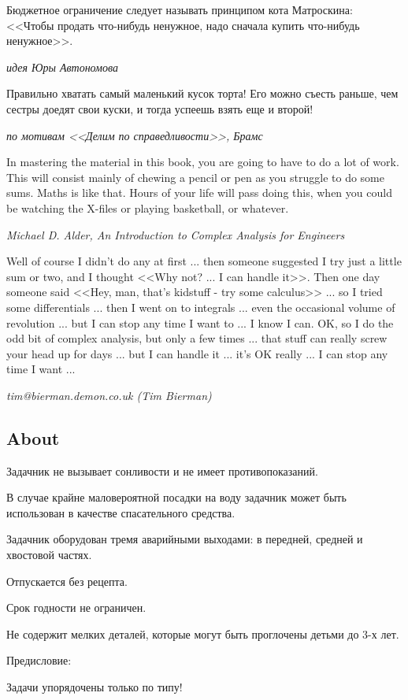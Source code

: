 Бюджетное ограничение следует называть принципом кота Матроскина: <<Чтобы продать что-нибудь ненужное, надо сначала купить что-нибудь ненужное>>.\par
{\it идея Юры Автономова}\par

Правильно хватать самый маленький кусок торта! Его можно съесть раньше, чем сестры доедят свои куски, и тогда успеешь взять еще и второй!\par
{\it по мотивам <<Делим по справедливости>>, Брамс}\par



In mastering the material in this book, you are going to have to do a lot of work. This will consist mainly of chewing a pencil or pen as you struggle to do some sums. Maths is like that. Hours of your life will pass doing this, when you could be watching the X-files or playing basketball, or whatever.\par
{\it Michael D. Alder, An Introduction to  Complex Analysis for Engineers}\par


Well of course I didn't do any at first ... then someone suggested I try just a little sum or two, and I thought <<Why not? ... I can handle it>>. Then one day someone said <<Hey, man, that's kidstuff - try some calculus>> ... so I tried some differentials ... then I went on to integrals ... even the occasional volume of revolution ... but I can stop any time I want to ... I know I can. OK, so I do the odd bit of complex analysis, but only a few times ... that stuff can really screw your head up for days ... but I can handle it ... it's OK really ... I can stop any time I want ...\par
{\it tim@bierman.demon.co.uk (Tim Bierman)}\par



\subsection{About} 

Задачник не вызывает сонливости и не имеет противопоказаний.\par
В случае крайне маловероятной посадки на воду задачник может быть использован в качестве спасательного средства. \par
Задачник оборудован тремя аварийными выходами: в передней, средней и хвостовой частях.\par
Отпускается без рецепта.\par
Срок годности не ограничен.\par
Не содержит мелких деталей, которые могут быть проглочены детьми до 3-х лет.\par
{\bf }Предисловие:\par
Задачи упорядочены только по типу!\par

